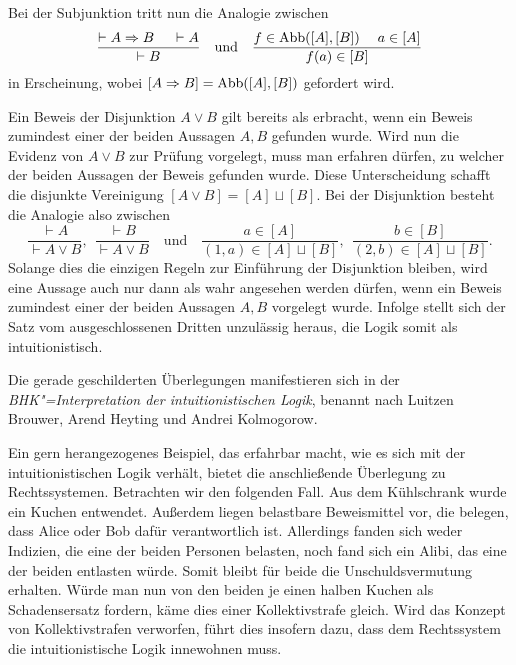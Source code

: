 Bei der Subjunktion tritt nun die Analogie zwischen
\[\dfrac{\vdash A\Rightarrow B\quad\;\vdash A}{\vdash B}\quad\text{und}\quad
\dfrac{f\in\mathrm{Abb}([A],[B])\quad\; a\in [A]}{f(a)\in [B]}\]
in Erscheinung, wobei $[A\Rightarrow B] = \mathrm{Abb}([A],[B])$ gefordert
wird.

Ein Beweis der Disjunktion $A\lor B$ gilt bereits als erbracht,
wenn ein Beweis zumindest einer der beiden Aussagen $A,B$ gefunden
wurde. Wird nun die Evidenz von $A\lor B$ zur Prüfung vorgelegt, muss
man erfahren dürfen, zu welcher der beiden Aussagen der Beweis gefunden
wurde. Diese Unterscheidung schafft die disjunkte Vereinigung
$[A\lor B] = [A]\sqcup [B]$. Bei der Disjunktion besteht die Analogie also zwischen
\[\dfrac{\vdash A}{\vdash A\lor B},\;\,\dfrac{\vdash B}{\vdash A\lor B}\quad\text{und}\quad
\dfrac{a\in [A]}{(1,a)\in [A]\sqcup [B]},\;\,\dfrac{b\in [B]}{(2,b)\in [A]\sqcup [B]}.\]
Solange dies die einzigen Regeln zur Einführung der Disjunktion
bleiben, wird eine Aussage auch nur dann als wahr angesehen werden
dürfen, wenn ein Beweis zumindest einer der beiden Aussagen $A,B$
vorgelegt wurde. Infolge stellt sich der Satz vom ausgeschlossenen
Dritten unzulässig heraus, die Logik somit als intuitionistisch.

Die gerade geschilderten Überlegungen manifestieren sich in der
\emph{BHK"=Interpretation der intuitionistischen Logik}, benannt
nach Luitzen Brouwer, Arend Heyting und Andrei Kolmogorow.

Ein gern herangezogenes Beispiel, das erfahrbar macht, wie es sich mit
der intuitionistischen Logik verhält, bietet die anschließende Überlegung
zu Rechtssystemen. Betrachten wir den folgenden Fall.
Aus dem Kühlschrank wurde ein Kuchen entwendet. Außerdem liegen
belastbare Beweismittel vor, die belegen, dass Alice oder Bob
dafür verantwortlich ist. Allerdings fanden sich weder Indizien,
die eine der beiden Personen belasten, noch fand sich ein Alibi, das
eine der beiden entlasten würde. Somit bleibt für beide die
Unschuldsvermutung erhalten.
Würde man nun von den beiden je einen halben Kuchen als Schadensersatz
fordern, käme dies einer Kollektivstrafe gleich. Wird das Konzept
von Kollektivstrafen verworfen, führt dies insofern dazu, dass dem
Rechtssystem die intuitionistische Logik innewohnen muss.

